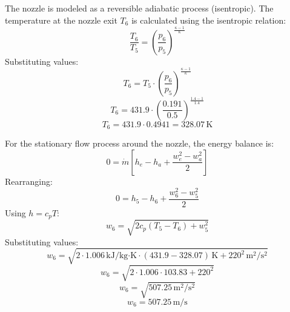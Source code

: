 The nozzle is modeled as a reversible adiabatic process (isentropic). The temperature at the nozzle exit \( T_6 \) is calculated using the isentropic relation:  
\[
\frac{T_6}{T_5} = \left( \frac{p_6}{p_5} \right)^{\frac{\kappa-1}{\kappa}}
\]  
Substituting values:  
\[
T_6 = T_5 \cdot \left( \frac{p_6}{p_5} \right)^{\frac{\kappa-1}{\kappa}}
\]  
\[
T_6 = 431.9 \cdot \left( \frac{0.191}{0.5} \right)^{\frac{1.4-1}{1.4}}
\]  
\[
T_6 = 431.9 \cdot 0.4941 = 328.07 \, \text{K}
\]  

For the stationary flow process around the nozzle, the energy balance is:  
\[
0 = \dot{m} \left[ h_e - h_a + \frac{w_e^2 - w_a^2}{2} \right]
\]  
Rearranging:  
\[
0 = h_5 - h_6 + \frac{w_6^2 - w_5^2}{2}
\]  
Using \( h = c_p T \):  
\[
w_6 = \sqrt{2 c_p (T_5 - T_6) + w_5^2}
\]  
Substituting values:  
\[
w_6 = \sqrt{2 \cdot 1.006 \, \text{kJ/kg·K} \cdot (431.9 - 328.07) \, \text{K} + 220^2 \, \text{m}^2/\text{s}^2}
\]  
\[
w_6 = \sqrt{2 \cdot 1.006 \cdot 103.83 + 220^2}
\]  
\[
w_6 = \sqrt{507.25 \, \text{m}^2/\text{s}^2}
\]  
\[
w_6 = 507.25 \, \text{m/s}
\]